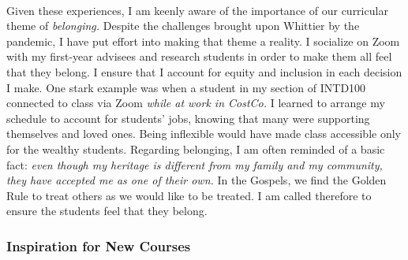 \documentclass[../../main.tex]{subfiles}
\begin{document}
\\
\vspace{0.25cm}
Given these experiences, I am keenly aware of the importance of our curricular theme of \textit{belonging.}  Despite the challenges brought upon Whittier by the pandemic, I have put effort into making that theme a reality.  I socialize on Zoom with my first-year advisees and research students in order to make them all feel that they belong.  I ensure that I account for equity and inclusion in each decision I make.  One stark example was when a student in my section of INTD100 connected to class via Zoom \textit{while at work in CostCo.}  I learned to arrange my schedule to account for students' jobs, knowing that many were supporting themselves and loved ones.  Being inflexible would have made class accessible only for the wealthy students.  Regarding belonging, I am often reminded of a basic fact: \textit{even though my heritage is different from my family and my community, they have accepted me as one of their own.}  In the Gospels, we find the Golden Rule to treat others as we would like to be treated.  I am called therefore to ensure the students feel that they belong.

\subsubsection{Inspiration for New Courses}
\end{document}

